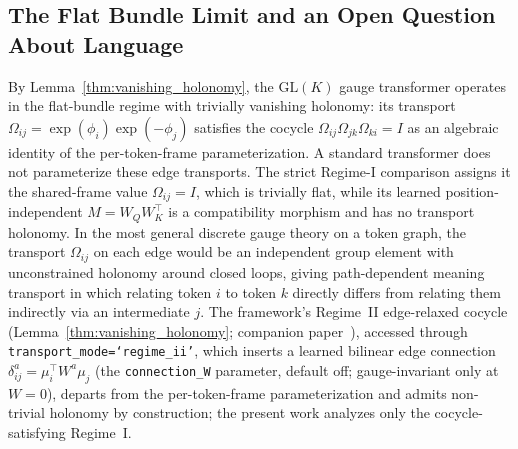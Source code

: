 \documentclass[twoside,11pt]{article}
\begin{document}
\subsection{The Flat Bundle Limit and an Open Question About Language}
\label{sec:flat_bundle}

By Lemma~\ref{thm:vanishing_holonomy}, the $\mathrm{GL}(K)$ gauge transformer operates in the flat-bundle regime with trivially vanishing holonomy: its transport $\Omega_{ij} = \exp(\phi_i)\exp(-\phi_j)$ satisfies the cocycle $\Omega_{ij}\Omega_{jk}\Omega_{ki} = I$ as an algebraic identity of the per-token-frame parameterization. A standard transformer does not parameterize these edge transports. The strict Regime-I comparison assigns it the shared-frame value $\Omega_{ij} = I$, which is trivially flat, while its learned position-independent $M = W_QW_K^\top$ is a compatibility morphism and has no transport holonomy. In the most general discrete gauge theory on a token graph, the transport $\Omega_{ij}$ on each edge would be an independent group element with unconstrained holonomy around closed loops, giving path-dependent meaning transport in which relating token $i$ to token $k$ directly differs from relating them indirectly via an intermediate $j$. The framework's Regime~II edge-relaxed cocycle (Lemma~\ref{thm:vanishing_holonomy}; companion paper~\citep{Dennis2025it}), accessed through \texttt{transport\_mode=\textquoteleft regime\_ii\textquoteright}, which inserts a learned bilinear edge connection $\delta_{ij}^a = \mu_i^\top W^a \mu_j$ (the \texttt{connection\_W} parameter, default off; gauge-invariant only at $W = 0$), departs from the per-token-frame parameterization and admits non-trivial holonomy by construction; the present work analyzes only the cocycle-satisfying Regime~I.
\end{document}
